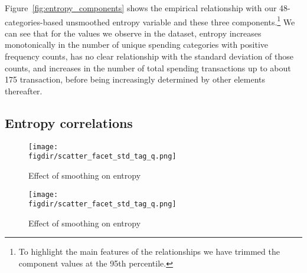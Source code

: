 Figure~\ref{fig:entropy_components} shows the empirical relationship with our
48-categories-based unsmoothed entropy variable and these three
components.\footnote{To highlight the main features of the relationships we
have trimmed the component values at the 95th percentile.} We can see that for
the values we observe in the dataset, entropy increases monotonically in the
number of unique spending categories with positive frequency counts, has no
clear relationship with the standard deviation of those counts, and increases
in the number of total spending transactions up to about 175 transaction,
before being increasingly determined by other elements thereafter.


\subsection{Entropy correlations}%
\label{sub:entropy_correlations}



\begin{figure}[H]
    \centering 
    \caption{Effect of smoothing on entropy}
    \label{fig:scatter_facets}
    \texttt{[image: \\figdir/scatter\_facet\_std\_tag\_q.png]}
\end{figure}

\begin{figure}[H]
    \centering 
    \caption{Effect of smoothing on entropy}
    \label{fig:scatter_facets}
    \texttt{[image: \\figdir/scatter\_facet\_std\_tag\_q.png]}
\end{figure}\newpage

